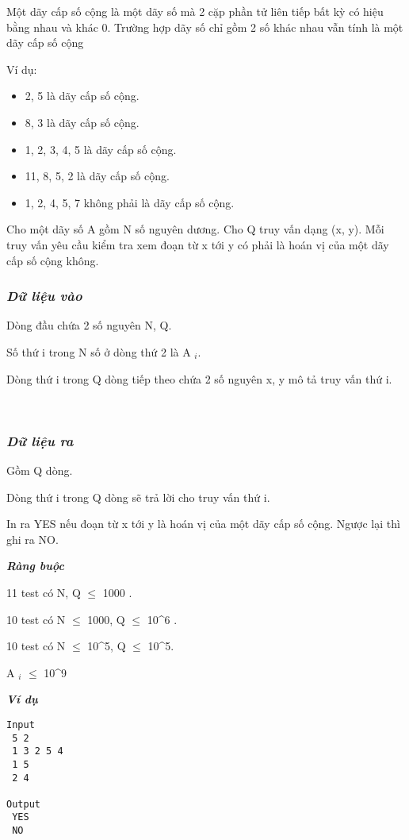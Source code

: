 

Một dãy cấp số cộng là một dãy số mà 2 cặp phần tử liên tiếp bất kỳ có hiệu bằng nhau và khác 0. Trường hợp dãy số chỉ gồm 2 số khác nhau vẫn tính là một dãy cấp số cộng

Ví dụ:
\begin{itemize}
	\item 2, 5 là dãy cấp số cộng.
	\item 8, 3 là dãy cấp số cộng.
	\item 1, 2, 3, 4, 5 là dãy cấp số cộng.
	\item 11, 8, 5, 2 là dãy cấp số cộng.
	\item 1, 2, 4, 5, 7 không phải là dãy cấp số cộng.
\end{itemize}

Cho một dãy số A gồm N số nguyên dương. Cho Q truy vấn dạng (x, y). Mỗi truy vấn yêu cầu kiểm tra xem đoạn từ x tới y có phải là hoán vị của một dãy cấp số cộng không.

\subsubsection{\emph{Dữ liệu vào }}

Dòng đầu chứa 2 số nguyên N, Q.

Số thứ i trong N số ở dòng thứ 2 là A $_ i. $

Dòng thứ i trong Q dòng tiếp theo chứa 2 số nguyên x, y mô tả truy vấn thứ i.

 

\subsubsection{\emph{Dữ liệu ra }}

Gồm Q dòng.

Dòng thứ i trong Q dòng sẽ trả lời cho truy vấn thứ i.

In ra YES nếu đoạn từ x tới y là hoán vị của một dãy cấp số cộng. Ngược lại thì ghi ra NO.

\emph{\textbf{Ràng buộc }}

11 test có N, Q  $\le$  1000 .

10 test có N  $\le$  1000, Q  $\le$  10^6 .

10 test có N  $\le$  10^5, Q  $\le$  10^5.

A $_ i $  $\le$  10^9

\emph{\textbf{Ví dụ }}
\begin{verbatim}
Input
 5 2
 1 3 2 5 4
 1 5
 2 4

Output
 YES
 NO


\end{verbatim}

 
